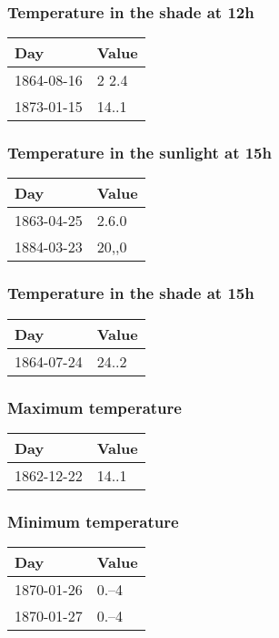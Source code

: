 \documentclass[]{article}
\begin{document}
\subsubsection{Temperature in the shade at
12h}\label{temperature-in-the-shade-at-12h}

\begin{longtable}[]{@{}ll@{}}
\toprule
Day & Value\tabularnewline
\midrule
\endhead
1864-08-16 & 2 2.4\tabularnewline
1873-01-15 & 14..1\tabularnewline
\bottomrule
\end{longtable}

\subsubsection{Temperature in the sunlight at
15h}\label{temperature-in-the-sunlight-at-15h}

\begin{longtable}[]{@{}ll@{}}
\toprule
Day & Value\tabularnewline
\midrule
\endhead
1863-04-25 & 2.6.0\tabularnewline
1884-03-23 & 20,,0\tabularnewline
\bottomrule
\end{longtable}

\subsubsection{Temperature in the shade at
15h}\label{temperature-in-the-shade-at-15h}

\begin{longtable}[]{@{}ll@{}}
\toprule
Day & Value\tabularnewline
\midrule
\endhead
1864-07-24 & 24..2\tabularnewline
\bottomrule
\end{longtable}

\subsubsection{Maximum temperature}\label{maximum-temperature}

\begin{longtable}[]{@{}ll@{}}
\toprule
Day & Value\tabularnewline
\midrule
\endhead
1862-12-22 & 14..1\tabularnewline
\bottomrule
\end{longtable}

\subsubsection{Minimum temperature}\label{minimum-temperature}

\begin{longtable}[]{@{}ll@{}}
\toprule
Day & Value\tabularnewline
\midrule
\endhead
1870-01-26 & 0.--4\tabularnewline
1870-01-27 & 0.--4\tabularnewline
\bottomrule
\end{longtable}
\end{document}
